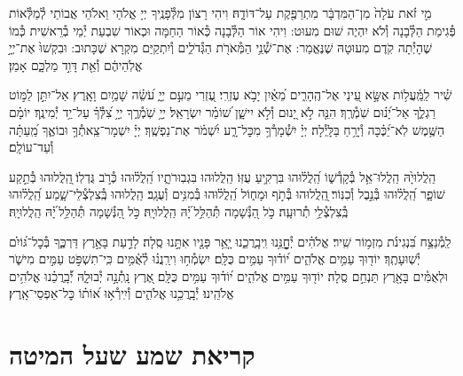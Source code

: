 \documentclass[twoside, openany, parskip=half, 11pt]{book}
\begin{document}
מִ֣י זֹ֗את עֹלָה֙ מִן־הַמִּדְבָּ֔ר מִתְרַפֶּ֖קֶת עַל־דּוֹדָ֑הּ׃
וִיהִי רָצוֹן מִלְּ֯פָנֶֽיךָ יְיָ אֱלֹהַי וֵאלֹהֵי אֲבוֹתַי לְ֯מַלְּ֯אוֹת פְּ֯גִימַת הַלְּ֯בָנָה וְ֯לֹא יִהְיֶה שׁוּם מִעוּט: וִיהִי אוֹר הַלְּ֯בָנָה כְּ֯אוֹר הַחַמָּה וּכְאוֹר שִׁבְעַת יְ֯מֵי בְ֯רֵאשִׁית כְּ֯מוֹ שֶׁהָיְ֯תָה קֹֽדֶם מִעוּטָהּ שֶׁנֶּאֱמַר:
אֶת־שְׁ֯נֵ֥י הַמְּ֯אֹרֹ֖ת הַגְּ֯דֹלִ֑ים וְ֯יִתְקַיַּם מִקְרָא שֶׁכָּתוּב: וּבִקְשׁוּ֙ אֶת־יְיָ֣ אֱלֹֽהֵיהֶ֔ם וְ֯אֵ֖ת דָּוִ֣ד מַלְכָּ֑ם אָמֵן׃


שִׁ֗יר לַֽמַּֽ֫עֲל֥וֹת אֶשָּׂ֣א עֵ֭ינַי אֶל־הֶֽהָרִ֑ים מֵ֝אַ֗יִן יָבֹ֥א עֶזְרִֽי׃ עֶ֭זְרִי מֵעִ֣ם יְיָ֑ עֹ֝שֵׂ֗ה שָׁמַ֥יִם וָאָֽרֶץ׃ אַל־יִתֵּ֣ן לַמּ֣וֹט רַגְלֶ֑ךָ אַל־יָ֝נ֗וּם שֹֽׁמְ֯רֶֽךָ׃ הִנֵּ֤ה לֹ֣א יָ֭נוּם וְ֯לֹ֣א יִישָׁ֑ן שׁ֝וֹמֵ֗ר יִשְׂרָאֵֽל׃ יְיָ֥ שֹֽׁמְ֯רֶ֑ךָ יְיָ֥ צִ֝לְּ֯ךָ֗ עַל־יַ֥ד יְ֯מִינֶֽךָ׃ יוֹמָ֗ם הַשֶּׁ֥מֶשׁ לֹֽא־יַ֝כֶּ֗כָּה וְ֯יָרֵ֥חַ בַּלָּֽיְ֯לָה׃ יְיָ֗ יִשְׁ֯מָרְ֯ךָ֥ מִכׇּל־רָ֑ע יִ֝שְׁמֹ֗ר אֶת־נַפְשֶֽׁךָ׃ יְיָ֗ יִשְׁמָר־צֵֽאתְ֯ךָ֥ וּבוֹאֶ֑ךָ מֵֽ֝עַתָּ֗ה וְ֯עַד־עוֹלָֽם׃

הַֽלֲלוּיָ֙הּ הַֽלֲלוּ־אֵ֥ל בְּ֯קָדְ֯שׁ֑וֹ הַֽ֝לֲל֗וּהוּ בִּרְקִ֥יעַ עֻזּֽוֹ׃
הַֽלֲלוּהוּ בִּגְבֽוּרֹתָ֑יו הַֽ֝לֲל֗וּהוּ כְּ֯רֹ֣ב גֻּדְלֽוֹ׃
֖הַֽלֲלוּהוּ בְּ֯תֵ֣קַע שׁוֹפָ֑ר הַֽ֝לֲל֗וּהוּ בְּ֯נֵ֣בֶל וְ֯כִנּֽוֹר׃
֖הַֽלֲלוּהוּ בְּ֯תֹ֣ף וּמָח֑וֹל הַֽ֝לֲל֗וּהוּ בְּ֯מִנִּ֥ים וְ֯עֻגָֽב׃
הַֽלֲלוּהוּ בְּֽ֯צִלְצְ֯לֵי־שָׁ֑מַע הַֽ֝לֲל֗וּהוּ בְּֽ֯צִלְצְ֯לֵ֥י תְ֯רוּעָֽה׃
כֹּ֣ל הַ֭נְּ֯שָׁמָה תְּ֯הַלֵּ֥ל ֝יָ֗הּ הַֽלֲלוּיָֽהּ׃
כֹּ֣ל הַ֭נְּ֯שָׁמָה תְּ֯הַלֵּ֥ל ֝יָ֗הּ הַֽלֲלוּיָֽהּ׃

\enlargethispage{\baselineskip}
לַֽמְ֯נַצֵּ֥ח
בִּ֝נְגִינֹ֗ת מִזְמ֥וֹר שִֽׁיר׃ אֱלֹהִ֗ים יְ֯חׇׇׇׇׇׇׇׇנֵּ֥נוּ וִֽיבָֽרֲכֵ֑נוּ יָ֤אֵ֥ר פָּנָ֖יו אִתָּ֣נוּ סֶֽלָה׃ לָדַ֣עַת בָּאָ֣רֶץ דַּרְכֶּ֑ךָ בְּ֯כׇל־גּ֝וֹיִ֗ם יְ֯שֽׁוּעָתֶֽךָ׃ יוֹד֖וּךָ עַמִּ֥ים אֱלֹהִ֑ים י֝וֹד֗וּךָ עַמִּ֥ים כֻּלָּֽם׃ יִשְׂמְ֯ח֥וּ וִירַֽנֲנ֗וּ לְ֯אֻ֫מִּ֥ים כִּֽי־תִשְׁפֹּ֣ט עַמִּ֣ים מִישֹׁ֑ר וּלְאֻמִּ֓ים בָּאָ֖רֶץ תַּנְחֵ֣ם סֶֽלָה׃ יוֹד֖וּךָ עַמִּ֥ים אֱלֹהִ֑ים י֝וֹד֗וּךָ עַמִּ֥ים כֻּלָּֽם׃ אֶ֭רֶץ נָֽתְ֯נָ֣ה יְ֯בוּלָ֑הּ יְ֝֯בָֽרֲכֵ֗נוּ אֱלֹהִ֥ים אֱלֹהֵֽינוּ׃ יְ֯בָֽרֲכֵ֥נוּ אֱלֹהִ֑ים וְ֯יִֽירְ֯א֥וּ א֝וֹת֗וֹ כׇּל־אַפְסֵי־אָֽרֶץ׃


\chapter[קריאת שמע שעל המיטה]{ קריאת שמע שעל המיטה }

\shema

\veahavta
\end{document}
